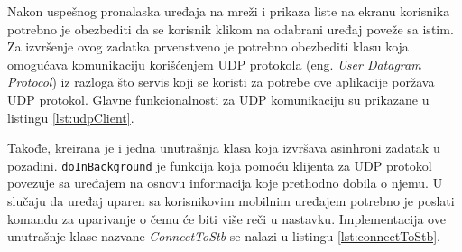 \documentclass[struktura.tex]{subfiles}
\begin{document}
Nakon uspešnog pronalaska uređaja na mreži i prikaza liste na ekranu korisnika potrebno je obezbediti da se korisnik klikom na odabrani uređaj poveže sa istim. Za izvršenje ovog zadatka prvenstveno je potrebno obezbediti klasu koja omogućava komunikaciju korišćenjem UDP protokola (eng. \textit{User Datagram Protocol}) iz razloga što servis koji se koristi za potrebe ove aplikacije poržava UDP protokol. Glavne funkcionalnosti za UDP komunikaciju su prikazane u listingu  \ref{lst:udpClient}.




Takođe, kreirana je i jedna unutrašnja klasa koja izvršava asinhroni zadatak u pozadini. \verb|doInBackground| je funkcija koja pomoću klijenta za UDP protokol povezuje sa uređajem na osnovu informacija koje prethodno dobila o njemu. U slučaju da uređaj uparen sa korisnikovim mobilnim uređajem potrebno je poslati komandu za uparivanje o čemu će biti više reči u nastavku. Implementacija ove unutrašnje klase nazvane \textit{ConnectToStb} se nalazi u listingu \ref{lst:connectToStb}.


\end{document}
